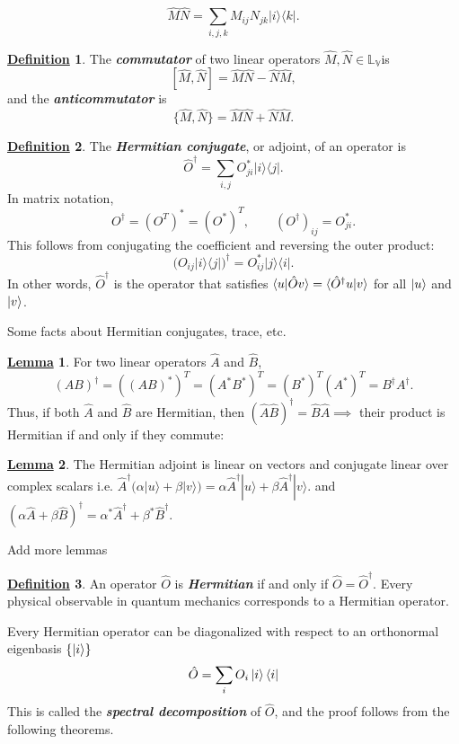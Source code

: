 \documentclass[11pt, answers]{exam}
\theoremstyle{definition}
\newtheorem{definition}{\underline{Definition}}[section]
\theoremstyle{bulleted}
\newtheorem{bulletlemma}{\underline{Lemma}}[section]
\begin{document}
	\[
		\hat M\hat N
		=
		\sum_{i,j,k}M_{ij}N_{jk}|i\rangle\langle k|.
	\]
	\begin{definition}
		The \textit{\textbf{commutator}} of two linear operators $\hat{M},\hat{N}\in\mathbb{L}_\mathbb{V}$is
		\[
		[\hat M,\hat N]=\hat M\hat N-\hat N\hat M,
		\]
		and the \textit{\textbf{anticommutator}} is
		\[
		\{\hat M,\hat N\}=\hat M\hat N+\hat N\hat M.
		\]
	\end{definition}
	\begin{definition}
		The \textit{\textbf{Hermitian conjugate}}, or adjoint, of an operator is
		\[
			\hat O^\dagger
			=
			\sum_{i,j}O_{ji}^{*}|i\rangle\langle j|.
		\]
		In matrix notation,
		\[
		O^\dagger=(O^T)^*=(O^*)^T,
		\qquad
		(O^\dagger)_{ij}=O_{ji}^*.
		\]
		This follows from conjugating the coefficient and reversing the outer product:
		\[
		\bigl(O_{ij}|i\rangle\langle j|\bigr)^\dagger
		=
		O_{ij}^*|j\rangle\langle i|.
		\]
		In other words, $\hat{O}^\dagger$ is the operator that satisfies $\braket{u|\hat{O}v} = \braket{\hat{O}^\dagger u | v}$ for all $\ket{u}$ and $\ket{v}$.
	\end{definition}
	
	\noindent Some facts about Hermitian conjugates, trace, etc.
	\begin{bulletlemma}
		For two linear operators $\hat{A}$ and $\hat{B}$,
		\[
		(AB)^\dagger=((AB)^*)^T
		=(A^*B^*)^T
		=(B^*)^T(A^*)^T
		=B^\dagger A^\dagger.
		\]
		Thus, if both $\hat{A}$ and $\hat{B}$ are Hermitian, then $(\hat A\hat B)^\dagger=\hat B\hat A \implies$ their product is Hermitian if and only if they commute:
	\end{bulletlemma}
	\begin{bulletlemma}
		The Hermitian adjoint is linear on vectors and conjugate linear over complex scalars i.e. $
		\hat A^\dagger\bigl(\alpha|u\rangle+\beta|v\rangle\bigr)
		=
		\alpha\hat A^\dagger|u\rangle
		+\beta\hat A^\dagger|v\rangle.
		$ and $
		(\alpha\hat A+\beta\hat B)^\dagger
		=
		\alpha^*\hat A^\dagger+\beta^*\hat B^\dagger.
		$
	\end{bulletlemma}
	\begin{todo}
		Add more lemmas
	\end{todo}
	
	\begin{definition}
		An operator $\hat{O}$ is \textit{\textbf{Hermitian}} if and only if $\hat{O} = \hat{O}^\dagger$. Every physical observable in quantum mechanics corresponds to a Hermitian operator.
	\end{definition}
	\noindent Every Hermitian operator can be diagonalized with respect to an orthonormal eigenbasis $\{\ket{i}\}$
	\begin{align*}
		\hat{O} = \sum_{i} O_i \ket{i}\bra{i}
	\end{align*}
	This is called the \textit{\textbf{spectral decomposition}} of $\hat{O}$, and the proof follows from the following theorems.
	
\end{document}
